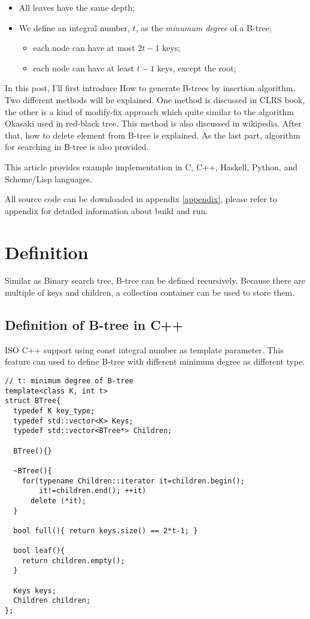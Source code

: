 \documentclass{article}
\begin{document}
\begin{itemize}
\item All leaves have the same depth;
\item We define an integral number, $t$, as the {\em minumum degree} of a 
B-tree;
    \begin{itemize}
        \item each node can have at most $2t-1$ keys;
        \item each node can have at least $t-1$ keys, except the root;
    \end{itemize}
\end{itemize}

In this post, I'll first introduce How to generate B-trees by insertion
algorithm. Two different methods will be explained. One method is discussed in CLRS
book, the other is a kind of modify-fix approach which quite similar to the
algorithm Okasaki used in red-black tree\cite{okasaki-rbtree}. This method
is also discussed in wikipedia\cite{wiki-b-tree}. After that, how to delete
element from B-tree is explained. As the last part, algorithm for searching 
in B-tree is also provided.

This article provides example implementation in C, C++, Haskell, Python, and 
Scheme/Lisp languages. 

All source code can be downloaded in appendix \ref{appendix}, please 
refer to appendix for detailed information about build and run.

\section{Definition}
\label{btree-definition}

Similar as Binary search tree, B-tree can be defined recursively.
Because there are multiple of keys and children, a collection container
can be used to store them.

\subsection*{Definition of B-tree in C++}
ISO C++ support using const integral number as template parameter.
This feature can used to define B-tree with different minimum degree
as different type.

\lstset{language=C++}
\begin{lstlisting}
// t: minimum degree of B-tree
template<class K, int t>
struct BTree{
  typedef K key_type;
  typedef std::vector<K> Keys;
  typedef std::vector<BTree*> Children;

  BTree(){}

  ~BTree(){
    for(typename Children::iterator it=children.begin();
        it!=children.end(); ++it)
      delete (*it);
  }

  bool full(){ return keys.size() == 2*t-1; }

  bool leaf(){
    return children.empty();
  }

  Keys keys;
  Children children; 
};
\end{lstlisting}
\end{document}
